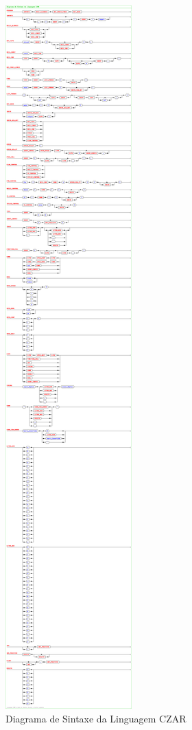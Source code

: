 \begin{figure}
	\centering 
	\includegraphics[width=\textwidth, clip, trim=0 0 0 4570px]{images/diagrama-sintaxe.png}  
	\caption{Diagrama de Sintaxe da Linguagem CZAR}
	\label{fig:diagrama-sintaxe-5}
\end{figure}
